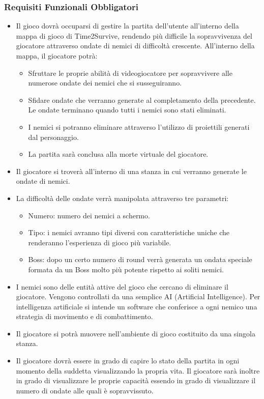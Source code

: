 \documentclass[a4paper,12pt]{report}
\begin{document}
\subsubsection{Requisiti Funzionali Obbligatori}
\begin{itemize}
	\item Il gioco dovrà occuparsi di gestire la partita dell’utente all’interno della mappa di gioco di Time2Survive, rendendo più difficile la sopravvivenza del giocatore attraverso ondate di nemici di difficoltà crescente.
    All’interno della mappa, il giocatore potrà:
    \begin{itemize}
        \item Sfruttare le proprie abilità di videogiocatore per sopravvivere alle numerose ondate dei nemici che si susseguiranno.
        \item Sfidare ondate che verranno generate al completamento della precedente. Le ondate terminano quando tutti i nemici sono stati eliminati.
        \item I nemici si potranno eliminare attraverso l'utilizzo di proiettili generati dal personaggio.
        \item La partita sarà conclusa alla morte virtuale del giocatore.
    \end{itemize}
	\item Il giocatore si troverà all'interno di una stanza in cui verranno generate le ondate di nemici.
	\item La difficoltà delle ondate verrà manipolata attraverso tre parametri:
    \begin{itemize}
        \item Numero: numero dei nemici a schermo.
        \item Tipo: i nemici avranno tipi diversi con caratteristiche uniche che renderanno l’esperienza di gioco più variabile.
        \item Boss: dopo un certo numero di round verrà generata un ondata speciale formata da un Boss molto più potente rispetto ai soliti nemici.
    \end{itemize}
	\item I nemici sono delle entità attive del gioco che cercano di eliminare il giocatore.
    Vengono controllati da una semplice AI (Artificial Intelligence). 
	Per intelligenza artificiale si intende un software che conferisce a ogni nemico una strategia di movimento e di combattimento.
	\item Il giocatore si potrà muovere nell’ambiente di gioco costituito da una singola stanza.
    \item Il giocatore dovrà essere in grado di capire lo stato della partita in ogni momento della suddetta visualizzando la propria vita. 
	Il giocatore sarà inoltre in grado di visualizzare le proprie capacità essendo in grado di visualizzare il numero di ondate alle quali è sopravvissuto.
\end{itemize}
\end{document}
